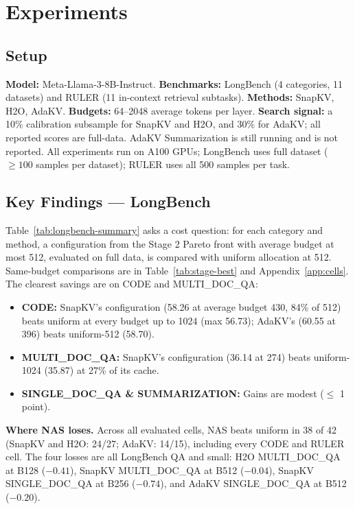 \documentclass[11pt]{article}
\begin{document}
\section{Experiments}

\subsection{Setup}

\textbf{Model:} Meta-Llama-3-8B-Instruct. \textbf{Benchmarks:} LongBench (4 categories, 11 datasets) and RULER (11 in-context retrieval subtasks). \textbf{Methods:} SnapKV, H2O, AdaKV. \textbf{Budgets:} 64–2048 average tokens per layer. \textbf{Search signal:} a 10\% calibration subsample for SnapKV and H2O, and 30\% for AdaKV; all reported scores are full-data. AdaKV Summarization is still running and is not reported. All experiments run on A100 GPUs; LongBench uses full dataset ($\geq 100$ samples per dataset); RULER uses all 500 samples per task.

\subsection{Key Findings — LongBench}
\label{sec:which-stage}

Table~\ref{tab:longbench-summary} asks a cost question: for each category and method, a configuration from the Stage 2 Pareto front with average budget at most 512, evaluated on full data, is compared with uniform allocation at 512. Same-budget comparisons are in Table~\ref{tab:stage-best} and Appendix~\ref{app:cells}. The clearest savings are on CODE and MULTI\_DOC\_QA:

\begin{itemize}
\item \textbf{CODE:} SnapKV's configuration (58.26 at average budget 430, 84\% of 512) beats uniform at every budget up to 1024 (max 56.73); AdaKV's (60.55 at 396) beats uniform-512 (58.70).
\item \textbf{MULTI\_DOC\_QA:} SnapKV's configuration (36.14 at 274) beats uniform-1024 (35.87) at 27\% of its cache.
\item \textbf{SINGLE\_DOC\_QA \& SUMMARIZATION:} Gains are modest ($\leq$ 1 point).
\end{itemize}

\textbf{Where NAS loses.} Across all evaluated cells, NAS beats uniform in 38 of 42 (SnapKV and H2O: 24/27; AdaKV: 14/15), including every CODE and RULER cell. The four losses are all LongBench QA and small: H2O MULTI\_DOC\_QA at B128 ($-0.41$), SnapKV MULTI\_DOC\_QA at B512 ($-0.04$), SnapKV SINGLE\_DOC\_QA at B256 ($-0.74$), and AdaKV SINGLE\_DOC\_QA at B512 ($-0.20$).
\end{document}
